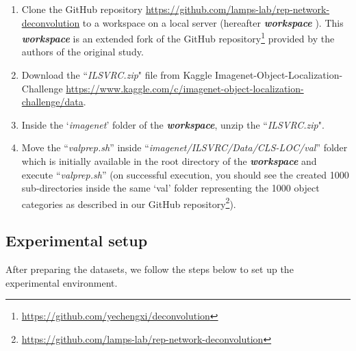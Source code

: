 \begin{enumerate}
    
    \item Clone the GitHub repository  \url{https://github.com/lamps-lab/rep-network-deconvolution} to a workspace on a local server (hereafter \textbf{\textit{workspace}} ). This \textbf{\textit{workspace}} is an extended fork of the GitHub repository\footnote{\url{https://github.com/yechengxi/deconvolution}} provided by the authors of the original study.
    \item Download the ``\textit{ILSVRC.zip}" file from Kaggle Imagenet-Object-Localization-Challenge \url{https://www.kaggle.com/c/imagenet-object-localization-challenge/data}.
    
    \item Inside the `\textit{imagenet}' folder of the \textbf{\textit{workspace}}, unzip the ``\textit{ILSVRC.zip}".
    \item Move the ``\textit{valprep.sh}” inside ``\textit{imagenet/ILSVRC/Data/CLS-LOC/val}” folder which is initially available in the root directory of the \textbf{\textit{workspace}} and execute ``\textit{valprep.sh}” (on successful execution, you should see the created 1000 sub-directories inside the same `val' folder representing the 1000  object categories as described in our GitHub repository\footnote{\url{https://github.com/lamps-lab/rep-network-deconvolution}}).
    
\end{enumerate}


\subsection{Experimental setup}

After preparing the datasets, we follow the steps below to set up the experimental environment. 

